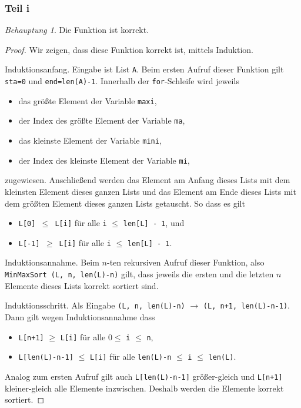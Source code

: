 \documentclass[a5paper]{article}
\theoremstyle{remark}
\newtheorem*{Behauptung}{Behauptung}
\begin{document}
\subsubsection{Teil i}
\begin{Behauptung}
  Die Funktion ist korrekt.
\end{Behauptung}
\begin{proof}
    Wir zeigen, dass diese Funktion korrekt ist, mittels Induktion.

  Induktionsanfang.  Eingabe ist List \texttt{A}.  Beim
  ersten Aufruf dieser Funktion gilt \texttt{sta=0} und
  \texttt{end=len(A)-1}.  Innerhalb der \texttt{for}-Schleife wird
  jeweils
  \begin{itemize}
  \item das größte Element der Variable \texttt{maxi},
  \item der Index des größte Element der Variable \texttt{ma},
  \item das kleinste Element der Variable \texttt{mini},
  \item der Index des kleinste Element der Variable \texttt{mi},
  \end{itemize}
  zugewiesen.  Anschließend werden das Element am Anfang dieses Lists
  mit dem kleinsten Element dieses ganzen Lists und das Element am
  Ende dieses Lists mit dem größten Element dieses ganzen Lists
  getauscht.  So dass es gilt
  \begin{itemize}
  \item \texttt{L[0] \(\leq\) L[i]} für alle \texttt{i} \(\leq\)
    \texttt{len[L] - 1}, und
  \item \texttt{L[-1] \(\geq\) L[i]} für alle \texttt{i} \(\leq\)
    \texttt{len[L] - 1}.
  \end{itemize}

  Induktionsannahme.  Beim \(n\)-ten rekursiven Aufruf dieser
  Funktion, also \texttt{MinMaxSort (L, n, len(L)-n)} gilt, dass
  jeweils die ersten und die letzten \(n\) Elemente dieses Lists korrekt
  sortiert sind.

  Induktionsschritt.  Als Eingabe \texttt{(L, n, len(L)-n)}
  \(\rightarrow\) \texttt{(L, n+1, len(L)-n-1)}.  Dann gilt wegen
  Induktionsannahme dass
  \begin{itemize}
  \item \texttt{L[n+1]} \(\geq\) \texttt{L[i]} für alle
  \(0\leq\) \texttt{i} \(\leq\) \texttt{n},
\item \texttt{L[len(L)-n-1]} \(\leq\) \texttt{L[i]} für alle
  \texttt{len(L)-n} \(\leq\) \texttt{i} \(\leq\) \texttt{len(L)}.
\end{itemize}

Analog zum ersten Aufruf gilt auch \texttt{L[len(L)-n-1]}
größer-gleich und \texttt{L[n+1]} kleiner-gleich alle Elemente
inzwischen.  Deshalb werden die Elemente korrekt sortiert.
\end{proof}
\end{document}

